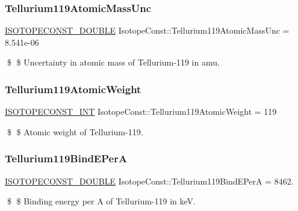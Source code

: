 \subsubsection{\texorpdfstring{Tellurium119\+Atomic\+Mass\+Unc}{Tellurium119AtomicMassUnc}}
{\footnotesize\ttfamily \mbox{\hyperlink{group___isotope_const-_macros_ga8f45a7272ce02c0b4c65c44636ed719a}{I\+S\+O\+T\+O\+P\+E\+C\+O\+N\+S\+T\+\_\+\+D\+O\+U\+B\+LE}} Isotope\+Const\+::\+Tellurium119\+Atomic\+Mass\+Unc = 8.\+541e-\/06}

\$ \$ Uncertainty in atomic mass of Tellurium-\/119 in amu. \mbox{\label{group___isotope_const-_tellurium-_te119_gaae672f4ef8c562268b9942101a1acb0c}} 
\subsubsection{\texorpdfstring{Tellurium119\+Atomic\+Weight}{Tellurium119AtomicWeight}}
{\footnotesize\ttfamily \mbox{\hyperlink{group___isotope_const-_macros_ga5f18360b3e99483a35c32d789e62621c}{I\+S\+O\+T\+O\+P\+E\+C\+O\+N\+S\+T\+\_\+\+I\+NT}} Isotope\+Const\+::\+Tellurium119\+Atomic\+Weight = 119}

\$ \$ Atomic weight of Tellurium-\/119. \mbox{\label{group___isotope_const-_tellurium-_te119_ga0acf5a3a0e05d0a2977b2499d8ef14f5}} 
\subsubsection{\texorpdfstring{Tellurium119\+Bind\+E\+PerA}{Tellurium119BindEPerA}}
{\footnotesize\ttfamily \mbox{\hyperlink{group___isotope_const-_macros_ga8f45a7272ce02c0b4c65c44636ed719a}{I\+S\+O\+T\+O\+P\+E\+C\+O\+N\+S\+T\+\_\+\+D\+O\+U\+B\+LE}} Isotope\+Const\+::\+Tellurium119\+Bind\+E\+PerA = 8462.}

\$ \$ Binding energy per A of Tellurium-\/119 in keV. \mbox{\label{group___isotope_const-_tellurium-_te119_ga98b6d561127e8a5ab3429e8950e3c091}} 
